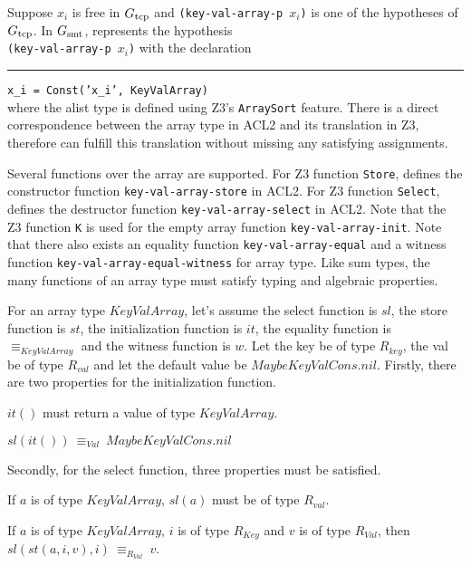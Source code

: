 Suppose $x_i$ is free in $G_{\mathrm{tcp}}$ and \texttt{(key-val-array-p $x_i$)} is one of
the hypotheses of $G_{\mathrm{tcp}}$. In $G_{\mathrm{smt}}$, \smtlink{} represents the hypothesis \\
\texttt{(key-val-array-p $x_i$)} with the declaration\\
\rule{2em}{0ex}\texttt{x\_i = Const('x\_i', KeyValArray)}\\
where the alist type is defined using Z3's \texttt{ArraySort} feature. There is
a direct correspondence between the array type in ACL2 and its translation in
Z3, therefore \smtlink{} can fulfill this translation without missing any
satisfying assignments.

Several functions over the array are supported.
For Z3 function \texttt{Store}, \smtlink{} defines the constructor function
\texttt{key-val-array-store} in ACL2. For Z3 function \texttt{Select},
\smtlink{} defines the destructor function \texttt{key-val-array-select} in
ACL2.
Note that the Z3 function \texttt{K} is used for the empty array function
\texttt{key-val-array-init}.
Note that there also exists an equality function
\texttt{key-val-array-equal} and a witness function
\texttt{key-val-array-equal-witness} for array type. Like sum types, the many
functions of an array type must satisfy typing and algebraic properties.

For an array type $KeyValArray$, let's assume the select function is
$sl$, the store function is $st$, the initialization function
is $it$, the equality function is $\equiv_{KeyValArray}$ and the witness function
is $w$. Let the key be of type $R_{key}$, the val be of type $R_{val}$ and let
the default value be $MaybeKeyValCons.nil$.
Firstly, there are two properties for the initialization function.
\begin{property}
  $it()$ must return a value of type $KeyValArray$.
\end{property}

\begin{property}
  $sl(it())\: \equiv_{Val}\: MaybeKeyValCons.nil$
\end{property}

\noindent Secondly, for the select function, three properties must be satisfied.
\begin{property}
  If $a$ is of type $KeyValArray$, $sl(a)$ must be of type $R_{val}$.
\end{property}

\begin{property}
  If $a$ is of type $KeyValArray$, $i$ is of type $R_{Key}$ and $v$ is of type
  $R_{Val}$, then $sl(st(a, i, v), i)\: \equiv_{R_{Val}}\: v$.
\end{property}

